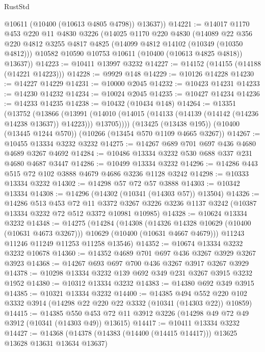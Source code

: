 \begin{lexlean}{RustStd}
\begin{coremodule}
        @10611
        (@10400 (@10613 @4805 @4798))
        @13637))
@14221 := @14017
    @1170
    @453
    @220
    @11
    @4830
    @3226
    (@14025
      @1170
      @220
      @4830
      (@14089
        @22
        @356
        @220
        @4812
        @3255
        @4817
        @4825
        (@14099 @4812 @14102 (@10349 (@10350 @4812)))
        @10582
        @10590
        @10753
        @10611
        (@10400 (@10613 @4825 @4818))
        @13637))
@14223 := @10411 @13997 @3232
@14227 := @14152 (@14155 (@14188 (@14221 @14223)))
@14228 := @9929 @148
@14229 := @10126 @14228
@14230 := @14227 @14229
@14231 := @10000 @2045
@14232 := @10423 @14231
@14233 := @14230 @14232
@14234 := @10024 @2045
@14235 := @10427 @14234
@14236 := @14233 @14235
@14238 := @10432 (@10434 @148)
@14264 := @13351
    (@13752
      (@13866
        (@13991 (@14010 (@14015 (@14133 (@14139 (@14142 (@14236 @14238 @13637)) @14223))) @13705))))
    (@13425 (@13438 @195))
    (@10400 (@13445 @1244 @570))
    (@10266 (@13454 @570 @1109 @4665 @3267))
@14267 := @10455 @13334 @3232 @3232
@14275 := @14267 @689 @701 @697 @436 @4680 @4689 @3267 @4692
@14284 := @10486 @13334 @3232 @530 @688 @337 @231 @4680 @4687 @3447
@14286 := @10499 @13334 @3232
@14296 := @14286 @443 @515 @72 @102 @3888 @4679 @4686 @3236 @1128 @3242
@14298 := @10333 @13334 @3232
@14302 := @14298 @57 @72 @57 @3888
@14303 := @10342 @13334
@14308 := @14296 (@14302 (@10341 (@14303 @57)) @13504)
@14326 := @14286
    @513
    @453
    @72
    @11
    @3372
    @3267
    @3226
    @3236
    @1137
    @3242
    (@10387 @13334 @3232 @72 @512 @3372 @10981 @10985)
@14328 := @10624 @13334 @3232
@14348 := @14275
    (@14284
      (@14308
        (@14326 @14328 @10629 (@10400 (@10631 @4673 @3267)))
        @10629
        (@10400 (@10631 @4667 @4679)))
      @11243
      @11246
      @11249
      @11253
      @11258
      @13546)
@14352 := @10674 @13334 @3232 @3232 @10678
@14360 := @14352 @4689 @701 @697 @436 @3267 @3929 @3267 @3923
@14368 := @14267 @693 @697 @700 @436 @3267 @3917 @3267 @3929
@14378 := @10298 @13334 @3232 @139 @692 @349 @231 @3267 @3915 @3232 @1952
@14380 := @10312 @13334 @3232
@14383 := @14380 @692 @349 @3915
@14385 := @10321 @13334 @3232
@14400 := @14385
    @494
    @552
    @220
    @102
    @3332
    @3914
    (@14298 @22 @220 @22 @3332 (@10341 (@14303 @22)) @10859)
@14415 := @14385
    @550
    @453
    @72
    @11
    @3912
    @3226
    (@14298 @49 @72 @49 @3912 (@10341 (@14303 @49)) @13615)
@14417 := @10411 @13334 @3232
@14427 := @14368 (@14378 (@14383 (@14400 (@14415 @14417))) @13625 @13628 @13631 @13634 @13637)

\end{coremodule}
\end{lexlean}
